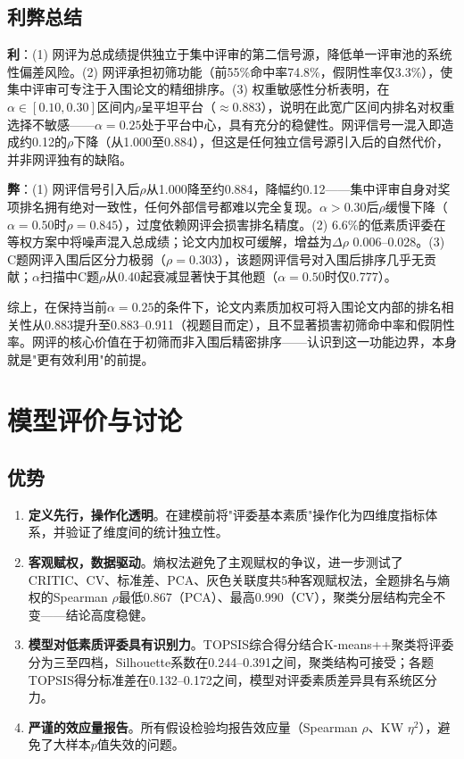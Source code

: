 \documentclass[UTF8,12pt]{ctexart}
\begin{document}
\subsection{利弊总结}

\textbf{利}：(1) 网评为总成绩提供独立于集中评审的第二信号源，降低单一评审池的系统性偏差风险。(2) 网评承担初筛功能（前55\%命中率74.8\%，假阴性率仅3.3\%），使集中评审可专注于入围论文的精细排序。(3) 权重敏感性分析表明，在$\alpha\in[0.10, 0.30]$区间内$\rho$呈平坦平台（$\approx$0.883），说明在此宽广区间内排名对权重选择不敏感——$\alpha=0.25$处于平台中心，具有充分的稳健性。网评信号一混入即造成约0.12的$\rho$下降（从1.000至0.884），但这是任何独立信号源引入后的自然代价，并非网评独有的缺陷。

\textbf{弊}：(1) 网评信号引入后$\rho$从1.000降至约0.884，降幅约0.12——集中评审自身对奖项排名拥有绝对一致性，任何外部信号都难以完全复现。$\alpha>0.30$后$\rho$缓慢下降（$\alpha=0.50$时$\rho=0.845$），过度依赖网评会损害排名精度。(2) 6.6\%的低素质评委在等权方案中将噪声混入总成绩；论文内加权可缓解，增益为$\Delta\rho$ 0.006--0.028。(3) C题网评入围后区分力极弱（$\rho=0.303$），该题网评信号对入围后排序几乎无贡献；$\alpha$扫描中C题$\rho$从0.40起衰减显著快于其他题（$\alpha=0.50$时仅0.777）。

综上，在保持当前$\alpha=0.25$的条件下，论文内素质加权可将入围论文内部的排名相关性从0.883提升至0.883--0.911（视题目而定），且不显著损害初筛命中率和假阴性率。网评的核心价值在于初筛而非入围后精密排序——认识到这一功能边界，本身就是"更有效利用"的前提。

\section{模型评价与讨论}

\subsection{优势}

\begin{enumerate}
    \item \textbf{定义先行，操作化透明}。在建模前将"评委基本素质"操作化为四维度指标体系，并验证了维度间的统计独立性。
    \item \textbf{客观赋权，数据驱动}。熵权法避免了主观赋权的争议，进一步测试了CRITIC、CV、标准差、PCA、灰色关联度共5种客观赋权法，全题排名与熵权的Spearman $\rho$最低0.867（PCA）、最高0.990（CV），聚类分层结构完全不变——结论高度稳健。
    \item \textbf{模型对低素质评委具有识别力}。TOPSIS综合得分结合K-means++聚类将评委分为三至四档，Silhouette系数在0.244--0.391之间，聚类结构可接受；各题TOPSIS得分标准差在0.132--0.172之间，模型对评委素质差异具有系统区分力。
    \item \textbf{严谨的效应量报告}。所有假设检验均报告效应量（Spearman $\rho$、KW $\eta^2$），避免了大样本$p$值失效的问题。
\end{enumerate}
\end{document}
